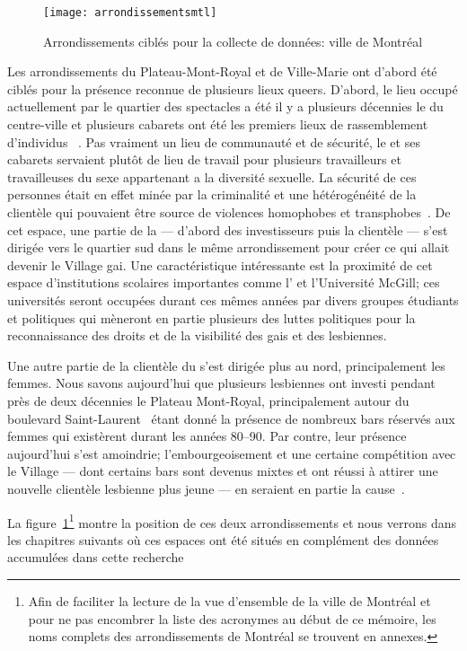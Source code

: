 \begin{figure}[ht]
 \centering
 \texttt{[image: arrondissementsmtl]}
 \caption[Arrondissements ciblés: ville de Montréal]{Arrondissements ciblés pour la collecte de données: ville de Montréal}\label{fig:arrondissementsmtl}
\end{figure}

Les arrondissements du Plateau-Mont-Royal et de Ville-Marie ont d'abord été ciblés pour la présence reconnue de plusieurs lieux queers.
D'abord, le lieu occupé actuellement par le quartier des spectacles a été il y a plusieurs décennies le  du centre-ville et plusieurs cabarets ont été les premiers lieux de rassemblement d'individus \lgbt{}~\citep[198]{Podmore2015}.
Pas vraiment un lieu de communauté et de sécurité, le  et ses cabarets servaient plutôt de lieu de travail pour plusieurs travailleurs et travailleuses du sexe appartenant a la diversité sexuelle.
La sécurité de ces personnes était en effet minée par la criminalité et une hétérogénéité de la clientèle qui pouvaient être source de violences homophobes et transphobes~\parencite[91]{Higgins1999}.
De cet espace, une partie de la  --- d'abord des investisseurs puis la clientèle --- s'est dirigée vers le quartier sud dans le même arrondissement pour créer ce qui allait devenir le Village gai.
Une caractéristique intéressante est la proximité de cet espace d'institutions scolaires importantes comme l'\uqam{} et l'Université McGill; ces universités seront occupées durant ces mêmes années par divers groupes étudiants et politiques qui mèneront en partie plusieurs des luttes politiques pour la reconnaissance des droits et de la visibilité des gais et des lesbiennes.

Une autre partie de la clientèle \lgbt{} du  s'est dirigée plus au nord, principalement les femmes.
Nous savons aujourd'hui que plusieurs lesbiennes ont investi pendant près de deux décennies le Plateau Mont-Royal, principalement autour du boulevard Saint-Laurent~\citep[599]{Podmore2006} étant donné la présence de nombreux bars réservés aux femmes qui existèrent durant les années 80--90.
Par contre, leur présence aujourd'hui s'est amoindrie; l'embourgeoisement et une certaine compétition avec le Village --- dont certains bars sont devenus mixtes et ont réussi à attirer une nouvelle clientèle lesbienne plus jeune --- en seraient en partie la cause~\citep{Podmore2015}.

La figure~\ref{fig:arrondissementsmtl}\footnote{Afin de faciliter la lecture de la vue d'ensemble de la ville de Montréal et pour ne pas encombrer la liste des acronymes au début de ce mémoire, les noms complets des arrondissements de Montréal se trouvent en annexes.} montre la position de ces deux arrondissements et nous verrons dans les chapitres suivants où ces espaces ont été situés en complément des données accumulées dans cette recherche 

